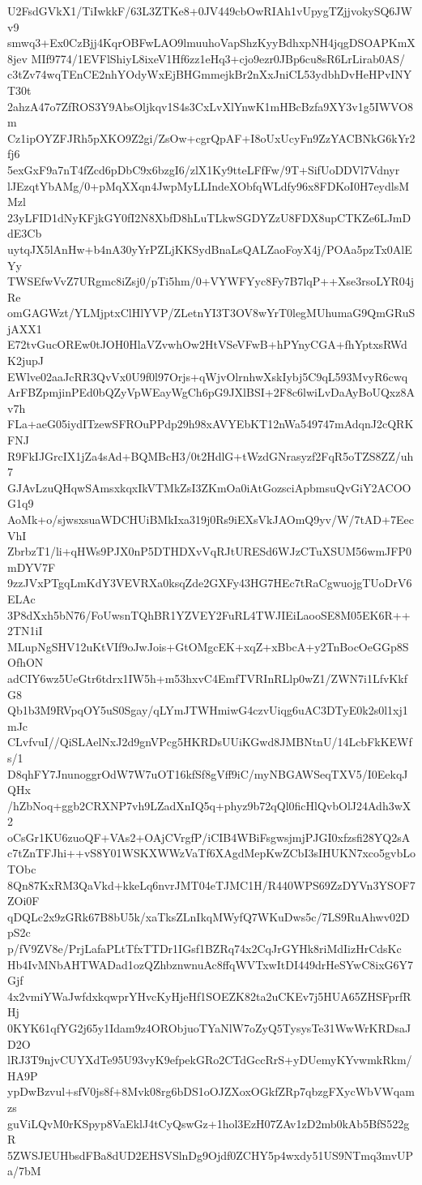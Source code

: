 U2FsdGVkX1/TiIwkkF/63L3ZTKe8+0JV449cbOwRIAh1vUpygTZjjvokySQ6JWv9
smwq3+Ex0CzBjj4KqrOBFwLAO9lmuuhoVapShzKyyBdhxpNH4jqgDSOAPKmX8jev
MIf9774/1EVFlShiyL8ixeV1Hf6zz1eHq3+cjo9ezr0JBp6cu8sR6LrLirab0AS/
c3tZv74wqTEnCE2nhYOdyWxEjBHGmmejkBr2nXxJniCL53ydbhDvHeHPvINYT30t
2ahzA47o7ZfROS3Y9AbsOljkqv1S4s3CxLvXlYnwK1mHBcBzfa9XY3v1g5IWVO8m
Cz1ipOYZFJRh5pXKO9Z2gi/ZsOw+cgrQpAF+I8oUxUcyFn9ZzYACBNkG6kYr2fj6
5exGxF9a7nT4fZcd6pDbC9x6bzgI6/zlX1Ky9tteLFfFw/9T+SifUoDDVl7Vdnyr
lJEzqtYbAMg/0+pMqXXqn4JwpMyLLIndeXObfqWLdfy96x8FDKoI0H7eydlsMMzl
23yLFID1dNyKFjkGY0fI2N8XbfD8hLuTLkwSGDYZzU8FDX8upCTKZe6LJmDdE3Cb
uytqJX5lAnHw+b4nA30yYrPZLjKKSydBnaLsQALZaoFoyX4j/POAa5pzTx0AlEYy
TWSEfwVvZ7URgmc8iZsj0/pTi5hm/0+VYWFYyc8Fy7B7lqP++Xse3rsoLYR04jRe
omGAGWzt/YLMjptxClHlYVP/ZLetnYI3T3OV8wYrT0legMUhumaG9QmGRuSjAXX1
E72tvGucOREw0tJOH0HlaVZvwhOw2HtVSeVFwB+hPYnyCGA+fhYptxsRWdK2jupJ
EWlve02aaJcRR3QvVx0U9f0l97Orjs+qWjvOlrnhwXskIybj5C9qL593MvyR6cwq
ArFBZpmjinPEd0bQZyVpWEayWgCh6pG9JXlBSI+2F8c6lwiLvDaAyBoUQxz8Av7h
FLa+aeG05iydITzewSFROuPPdp29h98xAVYEbKT12nWa549747mAdqnJ2cQRKFNJ
R9FkIJGrcIX1jZa4sAd+BQMBcH3/0t2HdlG+tWzdGNrasyzf2FqR5oTZS8ZZ/uh7
GJAvLzuQHqwSAmsxkqxIkVTMkZsI3ZKmOa0iAtGozsciApbmsuQvGiY2ACOOG1q9
AoMk+o/sjwsxsuaWDCHUiBMkIxa319j0Rs9iEXsVkJAOmQ9yv/W/7tAD+7EecVhI
ZbrbzT1/li+qHWs9PJX0nP5DTHDXvVqRJtURESd6WJzCTuXSUM56wmJFP0mDYV7F
9zzJVxPTgqLmKdY3VEVRXa0ksqZde2GXFy43HG7HEc7tRaCgwuojgTUoDrV6ELAc
3P8dXxh5bN76/FoUwsnTQhBR1YZVEY2FuRL4TWJIEiLaooSE8M05EK6R++2TN1iI
MLupNgSHV12uKtVIf9oJwJois+GtOMgcEK+xqZ+xBbcA+y2TnBocOeGGp8SOfhON
adCIY6wz5UeGtr6tdrx1IW5h+m53hxvC4EmfTVRInRLlp0wZ1/ZWN7i1LfvKkfG8
Qb1b3M9RVpqOY5uS0Sgay/qLYmJTWHmiwG4czvUiqg6uAC3DTyE0k2s0l1xj1mJc
CLvfvuI//QiSLAelNxJ2d9gnVPcg5HKRDsUUiKGwd8JMBNtnU/14LcbFkKEWfs/1
D8qhFY7JnunoggrOdW7W7uOT16kfSf8gVff9iC/myNBGAWSeqTXV5/I0EekqJQHx
/hZbNoq+ggb2CRXNP7vh9LZadXnIQ5q+phyz9b72qQl0ficHlQvbOlJ24Adh3wX2
oCsGr1KU6zuoQF+VAs2+OAjCVrgfP/iCIB4WBiFsgwsjmjPJGI0xfzsfi28YQ2sA
c7tZnTFJhi++vS8Y01WSKXWWzVaTf6XAgdMepKwZCbI3sIHUKN7xco5gvbLoTObc
8Qn87KxRM3QaVkd+kkeLq6nvrJMT04eTJMC1H/R440WPS69ZzDYVn3YSOF7ZOi0F
qDQLc2x9zGRk67B8bU5k/xaTksZLnIkqMWyfQ7WKuDws5c/7LS9RuAhwv02DpS2c
p/fV9ZV8e/PrjLafaPLtTfxTTDr1IGsf1BZRq74x2CqJrGYHk8riMdIizHrCdsKc
Hb4IvMNbAHTWADad1ozQZhbznwnuAc8ffqWVTxwItDI449drHeSYwC8ixG6Y7Gjf
4x2vmiYWaJwfdxkqwprYHvcKyHjeHf1SOEZK82ta2uCKEv7j5HUA65ZHSFprfRHj
0KYK61qfYG2j65y1Idam9z4ORObjuoTYaNlW7oZyQ5TysysTe31WwWrKRDsaJD2O
lRJ3T9njvCUYXdTe95U93vyK9efpekGRo2CTdGccRrS+yDUemyKYvwmkRkm/HA9P
ypDwBzvul+sfV0js8f+8Mvk08rg6bDS1oOJZXoxOGkfZRp7qbzgFXycWbVWqamzs
guViLQvM0rKSpyp8VaEklJ4tCyQswGz+1hol3EzH07ZAv1zD2mb0kAb5BfS522gR
5ZWSJEUHbsdFBa8dUD2EHSVSlnDg9Ojdf0ZCHY5p4wxdy51US9NTmq3mvUPa/7bM
